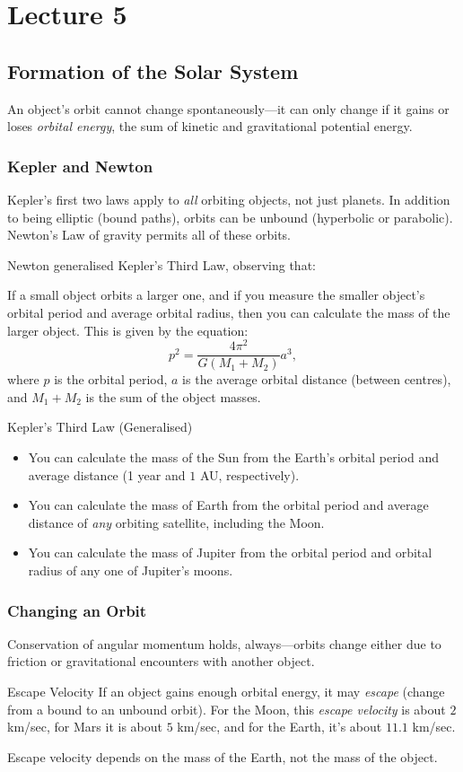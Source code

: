 \documentclass[class=article, crop=false]{standalone}
\begin{document}
  \section{Lecture 5}
  \subsection{Formation of the Solar System}
  An object's orbit cannot change spontaneously---it can only change if it gains or loses \emph{orbital energy}, the sum of kinetic and gravitational potential energy. \par
  \subsubsection{Kepler and Newton}
  Kepler's first two laws apply to \emph{all} orbiting objects, not just planets. In addition to being elliptic (bound paths), orbits can be unbound (hyperbolic or parabolic). Newton's Law of gravity permits all of these orbits. \par
  Newton generalised Kepler's Third Law, observing that: \par
  If a small object orbits a larger one, and if you measure the smaller object's orbital period and average orbital radius, then you can calculate the mass of the larger object. This is given by the equation:
  \[
    p^2 = \frac{4\pi^2}{G(M_1+M_2)}a^3,
  \]
  where $p$ is the orbital period, $a$ is the average orbital distance (between centres), and $M_1+M_2$ is the sum of the object masses.
  \begin{example}{Kepler's Third Law (Generalised)}
    \begin{itemize}
      \item You can calculate the mass of the Sun from the Earth's orbital period and average distance (1 year and $1$ AU, respectively).
      \item You can calculate the mass of Earth from the orbital period and average distance of \emph{any} orbiting satellite, including the Moon.
      \item You can calculate the mass of Jupiter from the orbital period and orbital radius of any one of Jupiter's moons.
    \end{itemize}
  \end{example}
  \subsubsection{Changing an Orbit}
  Conservation of angular momentum holds, always---orbits change either due to friction or gravitational encounters with another object.
  \begin{definition}{Escape Velocity}
    If an object gains enough orbital energy, it may \emph{escape} (change from a bound to an unbound orbit). For the Moon, this \emph{escape velocity} is about $2$ km/sec, for Mars it is about $5$ km/sec, and for the Earth, it's about $11.1$ km/sec.
  \end{definition}
  \begin{note}{}
    Escape velocity depends on the mass of the Earth, not the mass of the object.
  \end{note}
\end{document}
